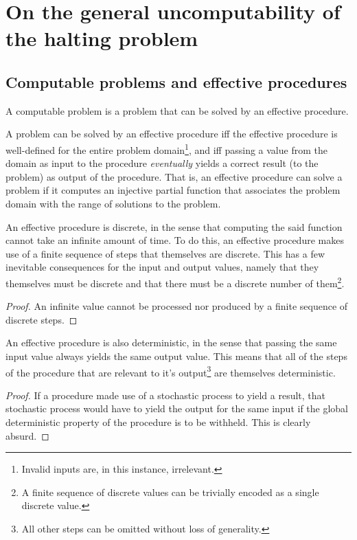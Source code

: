 \chapter{On the general uncomputability of the halting problem}

\section{Computable problems and effective procedures}

A computable problem is a problem that can be solved by an effective procedure.

A problem can be solved by an effective procedure iff the effective procedure
is well-defined for the entire problem domain\footnote{Invalid inputs are, in
this instance, irrelevant.}, and iff passing a value from the domain as input
to the procedure \emph{eventually} yields a correct result (to the problem) as
output of the procedure. That is, an effective procedure can solve a problem if
it computes an injective partial function that associates the problem domain
with the range of solutions to the problem.

An effective procedure is discrete, in the sense that computing the said
function cannot take an infinite amount of time. To do this, an effective
procedure makes use of a finite sequence of steps that themselves are discrete.
This has a few inevitable consequences for the input and output values, namely
that they themselves must be discrete and that there must be a discrete number
of them\footnote{A finite sequence of discrete values can be trivially encoded
as a single discrete value.}.

\begin{proof} An infinite value cannot be processed nor produced by a finite
sequence of discrete steps.\end{proof}

An effective procedure is also deterministic, in the sense that passing the
same input value always yields the same output value. This means that all of
the steps of the procedure that are relevant to it's output\footnote{All other
steps can be omitted without loss of generality.} are themselves deterministic.

\begin{proof} If a procedure made use of a stochastic process to yield a
result, that stochastic process would have to yield the output for the same
input if the global deterministic property of the procedure is to be withheld.
This is clearly absurd.\end{proof}

